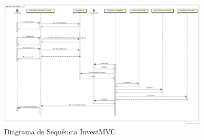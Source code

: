 \begin{figure}[H]
\centering
\includegraphics[width=0.9\textwidth]{figuras/sequencia}
\caption{Diagrama de Sequência InvestMVC} 
\label{sequencia}
\end{figure}
